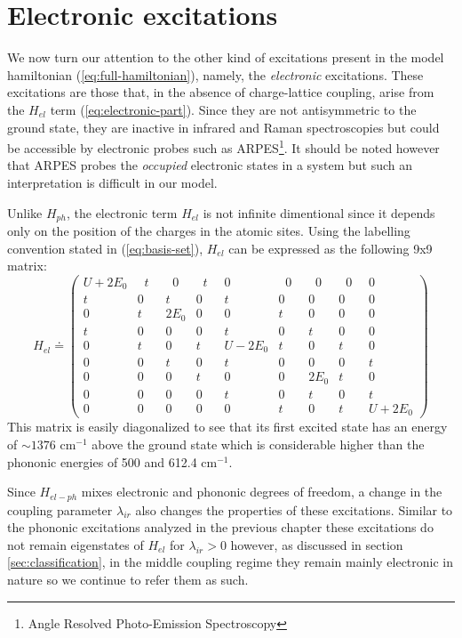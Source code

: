 \chapter{Electronic excitations}
\label{chap:electronic}

We now turn our attention to the other kind of excitations present in the model hamiltonian (\ref{eq:full-hamiltonian}), namely, the \textit{electronic} excitations.
These excitations are those that, in the absence of charge-lattice coupling, arise from the $H_{el}$ term (\ref{eq:electronic-part}).
Since they are not antisymmetric to the ground state, they are inactive in infrared and Raman spectroscopies but could be accessible by electronic probes such as ARPES\footnote{Angle Resolved Photo-Emission Spectroscopy}.
It should be noted however that ARPES probes the \textit{occupied} electronic states in a system but such an interpretation is difficult in our model.

Unlike $H_{ph}$, the electronic term $H_{el}$ is not infinite dimentional since it depends only on the position of the charges in the atomic sites. 
Using the labelling convention stated in (\ref{eq:basis-set}), $H_{el}$ can be expressed as the following 9x9 matrix:
%
\begin{equation}\label{eq:Hel-matrix} 
  H_{el} \doteq
  \left( 
    \begin{array}{ccccccccc} 
      U+2E_0 &\;\;t\;\;&\;\;0\;\;&\;\;t\;\;&0&\;\;0\;\;&\;\;0\;\;&\;\;0\;\;&0 \\
      t&0&t&0&t&0&0&0&0 \\
      0&t&2E_0 &0&0&t&0&0&0 \\
      t&0&0&0&t&0&t&0&0 \\
      0&t&0&t&U-2E_0 &t&0&t&0 \\
      0&0&t&0&t&0&0&0&t \\
      0&0&0&t&0&0&2E_0 &t&0 \\
      0&0&0&0&t&0&t&0&t \\
      0&0&0&0&0&t&0&t&U+2E_0  
    \end{array} 
  \right)
\end{equation}
%
This matrix is easily diagonalized to see that its first excited state has an energy of $\sim 1376$ cm$^{-1}$ above the ground state which is considerable higher than the phononic energies of 500 and 612.4 cm$^{-1}$.

Since $H_{el-ph}$ mixes electronic and phononic degrees of freedom, a change in the coupling parameter $\lambda_{ir}$ also changes the properties of these excitations.
Similar to the phononic excitations analyzed in the previous chapter these excitations do not remain eigenstates of $H_{el}$ for $\lambda_{ir}>0$ however, as discussed in section \ref{sec:classification}, in the middle coupling regime they remain mainly electronic in nature so we continue to refer them as such.

